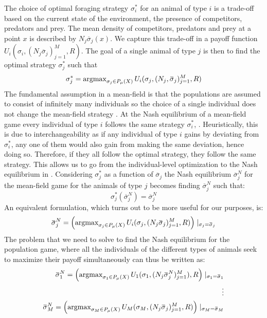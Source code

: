 The choice of optimal foraging strategy $\sigma_i^*$ for an animal of type $i$ is a trade-off based on the current state of the environment, the presence of competitors, predators and prey. The mean density of competitors, predators and prey at a point $x$ is described by $N_j \overbar{\sigma}_j(x)$. We capture this trade-off in a payoff function $U_i(\sigma_i, (N_j \overbar{\sigma}_j)_{j=1}^M, R)$. The goal of a single animal of type $j$ is then to find the optimal strategy $\sigma_j^*$ such that
\begin{equation}
  \label{eq:ind_opt}
  \sigma^*_j = \argmax_{\sigma_j \in P_{\mu}(X)} U_i(\sigma_j, (N_j, \overbar{\sigma}_j)_{j=1}^M, R)
\end{equation}
The fundamental assumption in a mean-field is that the populations are assumed to consist of infinitely many individuals so the choice of a single individual does not change the mean-field strategy \citep{aumann1964markets}. At the Nash equilibrium of a mean-field game every individual of type $i$ follows the same strategy $\sigma_i^*$, \citep{lasry2007mean}. Heuristically, this is due to interchangeability as if any individual of type $i$ gains by deviating from $\sigma_i^*$, any one of them would also gain from making the same deviation, hence doing so. Therefore, if they all follow the optimal strategy, they follow the same strategy. This allows us to go from the individual-level optimization to the Nash equilibrium in . Considering $\sigma^*_{j}$ as a function of $\overbar{\sigma}_j$ the Nash equilibrium $\overbar{\sigma}_j^N$ for the mean-field game for the animals of type $j$ becomes finding $\overbar{\sigma}_j^N$ such that:
\begin{equation}
  \sigma^*_{j}(\overbar{\sigma}^N_j) = \overbar{\sigma}^N_j
\end{equation}
An equivalent formulation, which turns out to be more useful for our purposes, is:
\begin{equation}
  \label{eq:mfg_ne}
  \overbar{\sigma}_j^N = \pa{\argmax_{\sigma_j \in P_{\mu}(X)} U_i(\sigma_j, (N_j \overbar{\sigma}_j)_{j=1}^M, R) } \mid_{\sigma_j = \overbar{\sigma}_j}
\end{equation}
The problem that we need to solve to find the Nash equilibrium for the population game, where all the individuals of the different types of animals seek to maximize their payoff simultaneously can thus be written as:
\begin{equation}
  \label{eq:tot_nash_eq}
  \begin{split}
    \overbar{\sigma}_1^N = \pa{\argmax_{\sigma_1 \in P_{\mu}(X)} U_1(\sigma_1, (N_j \overbar{\sigma}^N_j)_{j=1}^M), R } \mid_{\sigma_1 = \overbar{\sigma}_1} \\
    \vdots \\
    \overbar{\sigma}_M^N = \pa{\argmax_{\sigma_M \in P_{\mu}(X)} U_M(\sigma_M, (N_j \overbar{\sigma}_j)_{j=1}^M, R) } \mid_{\sigma_M = \overbar{\sigma}_M}
    \end{split}
\end{equation}

